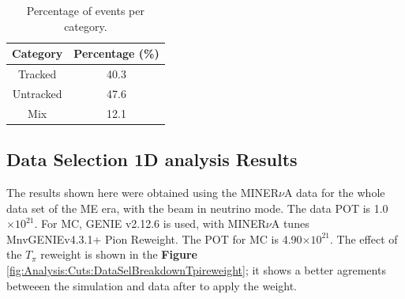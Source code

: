 \begin{table}[!htb]
    \centering
    \begin{tabular}{c|c}
         Category  & Percentage (\%) \\ \hline
         Tracked   &  40.3 \\
         Untracked &  47.6\\
         Mix       & 12.1
    \end{tabular}
    \caption{Percentage of events per category.}
    \label{tab:Analysis:Cuts:CategoryPercentage}
\end{table}

\pagebreak

\subsection{Data Selection 1D analysis Results}
\label{Cap:Analysis:DataSelectionResults1D}

The results shown here were obtained using the MINER$\nu$A data for the whole data set of the ME era, with the beam in neutrino mode. The data POT is 1.0$\times 10^{21}$. For MC, GENIE v2.12.6 is used, with MINER$\nu$A tunes MnvGENIEv4.3.1+ Pion Reweight. The POT for MC is 4.90$\times 10^{21}$. The effect of the $T_\pi$ reweight is shown in the \textbf{Figure} \ref{fig:Analysis:Cuts:DataSelBreakdownTpireweight}; it shows a better agrements betweeen the simulation and data after to apply the weight. 

